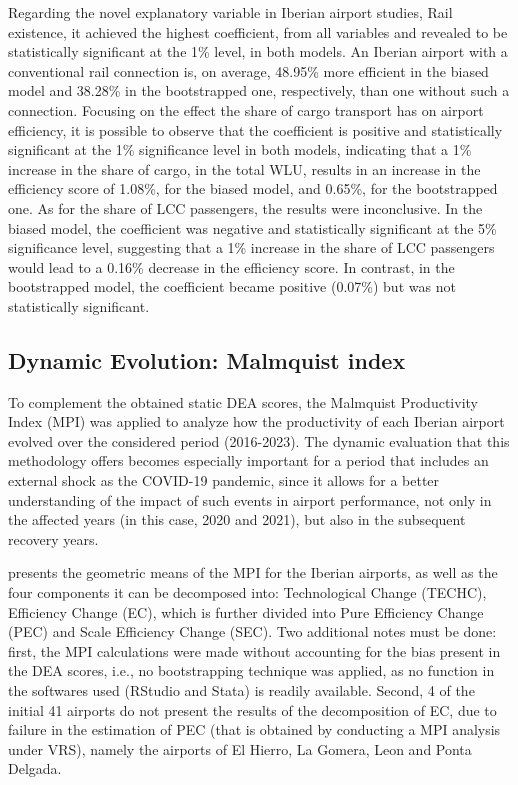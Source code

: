 \vspace{-0.5cm}
 Regarding the novel explanatory variable in Iberian airport studies, Rail existence, it achieved the
highest coefficient, from all variables and revealed to be statistically significant at the 1\% level, in both
models. An Iberian airport with a conventional rail connection is, on average, 48.95\% more efficient in
the biased model and 38.28\% in the bootstrapped one, respectively, than one without such a connection. Focusing on the effect the share of cargo transport has on airport efficiency, it is possible to observe
that the coefficient is positive and statistically significant at the 1\% significance level in both models,
indicating that a 1\% increase in the share of cargo, in the total WLU, results in an increase in the
efficiency score of 1.08\%, for the biased model, and 0.65\%, for the bootstrapped one. As for the share of LCC passengers, the results were inconclusive. In the biased model, the coefficient was negative and statistically significant at the 5\% significance level, suggesting that a 1\% increase
in the share of LCC passengers would lead to a 0.16\% decrease in the efficiency score. In contrast, in
the bootstrapped model, the coefficient became positive (0.07\%) but was not statistically significant.





\subsection{Dynamic Evolution: Malmquist index}
\label{subsec:resul_malm}
To complement the obtained static DEA scores, the Malmquist Productivity Index
(MPI) was applied to analyze how the productivity of each Iberian airport evolved over the considered
period (2016-2023). The dynamic evaluation that this methodology offers becomes especially important
for a period that includes an external shock as the COVID-19 pandemic, since it allows for a better
understanding of the impact of such events in airport performance, not only in the affected years (in this
case, 2020 and 2021), but also in the subsequent recovery years.

 presents the geometric means of the MPI for the Iberian airports, as well as the four components it can be decomposed into: Technological Change (TECHC), Efficiency Change (EC), which is further divided into Pure Efficiency Change (PEC) and Scale Efficiency Change (SEC). Two additional notes must be done: first, the MPI calculations were made without accounting for the bias present in
the DEA scores, i.e., no bootstrapping technique was applied, as no function in the softwares used (RStudio and Stata) is readily available. Second, 4 of the initial 41 airports do not present the results of
the decomposition of EC, due to failure in the estimation of PEC (that is obtained by conducting a MPI
analysis under VRS), namely the airports of El Hierro, La Gomera, Leon and Ponta Delgada.


